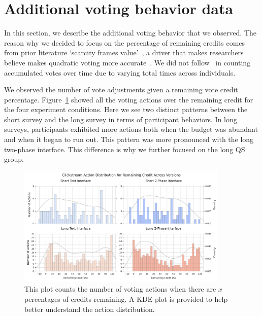 \section{Additional voting behavior data}
\label{apdx:additional_results_behavior}
In this section, we describe the additional voting behavior that we observed. The reason why we decided to focus on the percentage of remaining credits comes from prior literature `scarcity frames value'~\cite{Shah2015a}, a driver that makes researchers believe makes quadratic voting more accurate~\cite{chengCanShowWhat2021}. We did not follow~\citet{quarfoot2017quadratic} in counting accumulated votes over time due to varying total times across individuals.

We observed the number of vote adjustments given a remaining vote credit percentage. Figure~\ref{apdxfig:voting_all} showed all the voting actions over the remaining credit for the four experiment conditions. Here we see two distinct patterns between the short survey and the long survey in terms of participant behaviors. In long surveys, participants exhibited more actions both when the budget was abundant and when it began to run out. This pattern was more pronounced with the long two-phase interface. This difference is why we further focused on the long QS group.

\begin{figure}[p]
    \centering
    \includegraphics[width=0.9\textwidth]{content/image/results/clickstream_action_distribution.pdf}
    \caption{This plot counts the number of voting actions when there are $x$ percentages of credits remaining. A KDE plot is provided to help better understand the action distribution.}
    \label{apdxfig:voting_all}
\end{figure}

